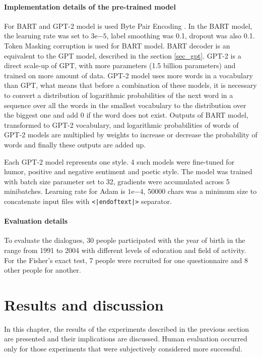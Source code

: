 \subsubsection{Implementation details of the pre-trained model}
For BART and GPT-2 model is used Byte Pair Encoding \cite{sennrich2015neural}. In the BART model, the learning rate \cite{jacobs1988increased} was set to $3\mathrm{e}{-5}$, label smoothing \cite{szegedy2016rethinking} was 0.1, dropout was also 0.1. Token Masking corruption is used for BART model. BART decoder is an equivalent to the GPT model, described in the section \ref{sec_gpt}. GPT-2 is a direct scale-up of GPT, with more parameters (1.5 billion parameters) and trained on more amount of data. GPT-2 model uses more words in a vocabulary than GPT, what means that before a combination of these models, it is necessary to convert a distribution of logarithmic probabilities of the next word in a sequence over all the words in the smallest vocabulary to the distribution over the biggest one and add 0 if the word does not exist. Outputs of BART model, transformed to GPT-2 vocabulary, and logarithmic probabilities of words of GPT-2 models are multiplied by weights to increase or decrease the probability of words and finally these outputs are added up.

Each GPT-2 model represents one style. 4 such models were fine-tuned for humor, positive and negative sentiment and poetic style. The model was trained with batch size parameter set to 32, gradients were accumulated across 5 minibatches. Learning rate for Adam is $1\mathrm{e}{-4}$, 50000 chars was a minimum size to concatenate input files with \texttt{<|endoftext|>} separator. 

\subsubsection{Evaluation details}
To evaluate the dialogues, 30 people participated with the year of birth in the range from 1991 to 2004 with different levels of education and field of activity. For the Fisher's exact test, 7 people were recruited for one questionnaire and 8 other people for another. 

\chapter{Results and discussion} \label{results_discuss}
In this chapter, the results of the experiments described in the previous section are presented and their implications are discussed. Human evaluation occurred only for those experiments that were subjectively considered more successful.

